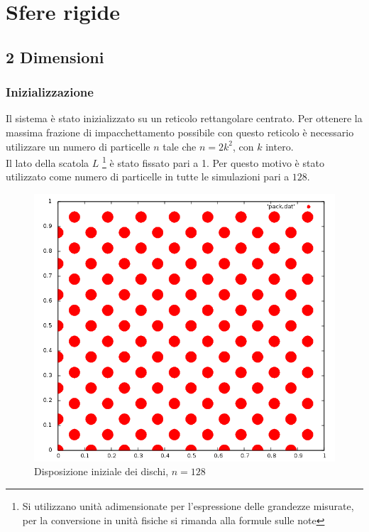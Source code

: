 




\tableofcontents 
\newpage

\chapter{Sfere rigide}

\section{2 Dimensioni}

\subsection{Inizializzazione}
Il sistema è stato inizializzato su un reticolo rettangolare centrato.
Per ottenere la massima frazione di impacchettamento possibile con questo reticolo è necessario utilizzare un numero di particelle $n$ tale che $ n = 2k^2$, con $k$ intero.\\
Il lato della scatola $L$ \footnote{Si utilizzano unità adimensionate per l'espressione delle grandezze misurate, per la conversione in unità fisiche si rimanda alla formule sulle note} è stato fissato pari a 1.
Per questo motivo è stato utilizzato come numero di particelle in tutte le simulazioni pari a $128$.
\begin{figure}[h]
	\centering
	\includegraphics[scale=0.5]{sfere2D/reticolo.png}
	\caption{Disposizione iniziale dei dischi, $n=128$}
\end{figure}
